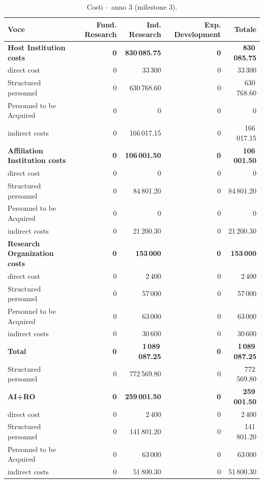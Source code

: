 \documentclass{plan4ari_report}
\begin{document}
\clearpage
\begin{table}[H]\centering\small
\caption{Costi -- anno 3 (milestone 3).}\label{tab:bpy-c-y3}
\begin{tabular}{lrrrr}\toprule
\textbf{Voce} & \textbf{Fund. Research} & \textbf{Ind. Research} & \textbf{Exp. Development} & \textbf{Totale} \\\midrule
\textbf{Host Institution costs} & \textbf{0} & \textbf{830\,085.75} & \textbf{0} & \textbf{830\,085.75} \\
\quad direct cost & 0 & 33\,300 & 0 & 33\,300 \\
\quad Structured personnel & 0 & 630\,768.60 & 0 & 630\,768.60 \\
\quad Personnel to be Acquired & 0 & 0 & 0 & 0 \\
\quad indirect costs & 0 & 166\,017.15 & 0 & 166\,017.15 \\
\textbf{Affiliation Institution costs} & \textbf{0} & \textbf{106\,001.50} & \textbf{0} & \textbf{106\,001.50} \\
\quad direct cost & 0 & 0 & 0 & 0 \\
\quad Structured personnel & 0 & 84\,801.20 & 0 & 84\,801.20 \\
\quad Personnel to be Acquired & 0 & 0 & 0 & 0 \\
\quad indirect costs & 0 & 21\,200.30 & 0 & 21\,200.30 \\
\textbf{Research Organization costs} & \textbf{0} & \textbf{153\,000} & \textbf{0} & \textbf{153\,000} \\
\quad direct cost & 0 & 2\,400 & 0 & 2\,400 \\
\quad Structured personnel & 0 & 57\,000 & 0 & 57\,000 \\
\quad Personnel to be Acquired & 0 & 63\,000 & 0 & 63\,000 \\
\quad indirect costs & 0 & 30\,600 & 0 & 30\,600 \\
\midrule
\textbf{Total} & \textbf{0} & \textbf{1\,089\,087.25} & \textbf{0} & \textbf{1\,089\,087.25} \\
\quad Structured personnel & 0 & 772\,569.80 & 0 & 772\,569.80 \\
\textbf{AI+RO} & \textbf{0} & \textbf{259\,001.50} & \textbf{0} & \textbf{259\,001.50} \\
\quad direct cost & 0 & 2\,400 & 0 & 2\,400 \\
\quad Structured personnel & 0 & 141\,801.20 & 0 & 141\,801.20 \\
\quad Personnel to be Acquired & 0 & 63\,000 & 0 & 63\,000 \\
\quad indirect costs & 0 & 51\,800.30 & 0 & 51\,800.30 \\
\bottomrule\end{tabular}
\end{table}
\end{document}
